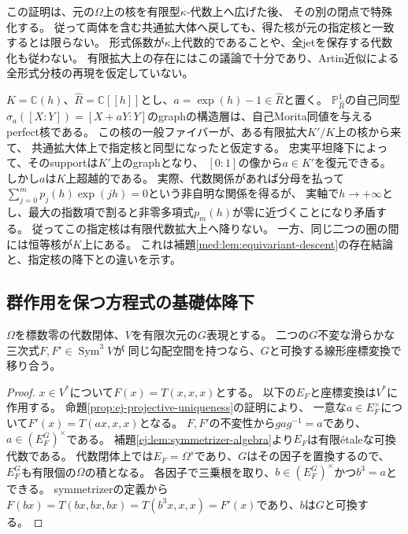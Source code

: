 \begin{remark}[存在の降下と指定形式核の降下]
\label{med:rem:formal-versus-existence}
この証明は、元の$\Omega$上の核を有限型$\kappa$-代数上へ広げた後、
その別の閉点で特殊化する。
従って両体を含む共通拡大体へ戻しても、得た核が元の指定核と一致するとは限らない。
形式係数が$\kappa$上代数的であることや、全jetを保存する代数化も従わない。
有限拡大上の存在にはこの議論で十分であり、Artin近似による全形式分枝の再現を仮定していない。
\end{remark}

\begin{example}[指定された完備核は有限拡大へ降りるとは限らない]
\label{med:ex:formal-kernel}
$K=\mathbb C(h)$、$\widehat R=\mathbb C[[h]]$とし、$a=\exp(h)-1\in\widehat R$と置く。
$\mathbb P^1_{\widehat R}$の自己同型
$\sigma_a([X:Y])=[X+aY:Y]$のgraphの構造層は、自己Morita同値を与えるperfect核である。
この核の一般ファイバーが、ある有限拡大$K'/K$上の核から来て、
共通拡大体上で指定核と同型になったと仮定する。
忠実平坦降下によって、そのsupportは$K'$上のgraphとなり、
$[0:1]$の像から$a\in K'$を復元できる。
しかし$a$は$K$上超越的である。
実際、代数関係があれば分母を払って
$\sum_{j=0}^m p_j(h)\exp(jh)=0$という非自明な関係を得るが、
実軸で$h\to+\infty$とし、最大の指数項で割ると非零多項式$p_m(h)$が零に近づくことになり矛盾する。
従ってこの指定核は有限代数拡大上へ降りない。
一方、同じ二つの圏の間には恒等核が$K$上にある。
これは補題\ref{med:lem:equivariant-descent}の存在結論と、指定核の降下との違いを示す。
\end{example}

\subsection{群作用を保つ方程式の基礎体降下}

\begin{lemma}[同じ勾配空間を持つ不変三次式の同変比較]
\label{med:lem:invariant-symmetrizer}
$\Omega$を標数零の代数閉体、$V$を有限次元の$G$表現とする。
二つの$G$不変な滑らかな三次式$F,F'\in\operatorname{Sym}^3V$が
同じ勾配空間を持つなら、$G$と可換する線形座標変換で移り合う。
\end{lemma}
\begin{proof}
$x\in V^*$について$F(x)=T(x,x,x)$とする。
以下の$E_F$と座標変換は$V^*$に作用する。
命題\ref{prop:ej-projective-uniqueness}の証明により、
一意な$a\in E_F^\times$について$F'(x)=T(ax,x,x)$となる。
$F,F'$の不変性から$gag^{-1}=a$であり、$a\in(E_F^G)^\times$である。
補題\ref{ej:lem:symmetrizer-algebra}より$E_F$は有限\'etaleな可換代数である。
代数閉体上では$E_F=\Omega^s$であり、$G$はその因子を置換するので、
$E_F^G$も有限個の$\Omega$の積となる。
各因子で三乗根を取り、$b\in(E_F^G)^\times$かつ$b^3=a$とできる。
symmetrizerの定義から
$F(bx)=T(bx,bx,bx)=T(b^3x,x,x)=F'(x)$であり、$b$は$G$と可換する。
\end{proof}

